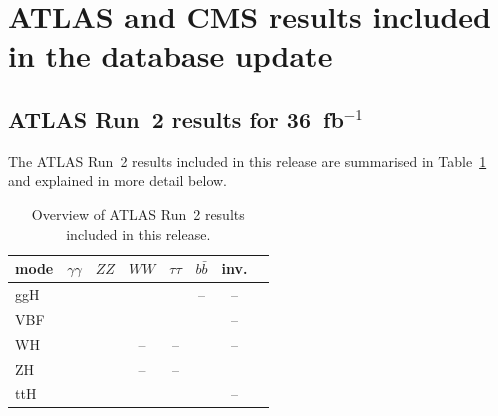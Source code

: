 \clearpage
\section{ATLAS and CMS results included in the database update}


\subsection{ATLAS Run~2 results for 36~fb$^{-1}$}

The ATLAS Run~2 results included in this release are summarised in Table~\ref{tab:ATLASresults} and explained in more detail below.

\begin{table}[h]\centering
\begin{tabular}{l | ccccccc}
mode & $\gamma\gamma$ & $ZZ$ & $WW$ & $\tau\tau$ & $b\bar b$ & inv. \\
\hline
ggH & \cite{Aaboud:2018xdt} & \cite{Aaboud:2017vzb} & \cite{Aaboud:2018jqu} & \cite{Aaboud:2018pen} & -- & --\\
VBF &  \cite{Aaboud:2018xdt} & \cite{Aaboud:2017vzb} & \cite{Aaboud:2018jqu} & \cite{Aaboud:2018pen} & \cite{Aaboud:2018gay} & -- \\
WH & \multirow{2}{*}{\!\!\cite{Aaboud:2018xdt}} & \multirow{2}{*}{\!\!\cite{Aaboud:2017vzb}} & -- & -- & \cite{Aaboud:2017xsd} & -- \\
ZH &  &  & -- & -- & \cite{Aaboud:2017xsd} & \cite{Aaboud:2017bja} \\
ttH & \cite{Aaboud:2018xdt,Aaboud:2017jvq} & \cite{Aaboud:2017vzb,Aaboud:2017jvq} & \cite{Aaboud:2017jvq} & \cite{Aaboud:2017jvq} & \cite{Aaboud:2017jvq,Aaboud:2017rss} & -- \\ 
\end{tabular}
\caption{Overview of ATLAS Run~2 results included in this release.} 
\label{tab:ATLASresults}
\end{table}

